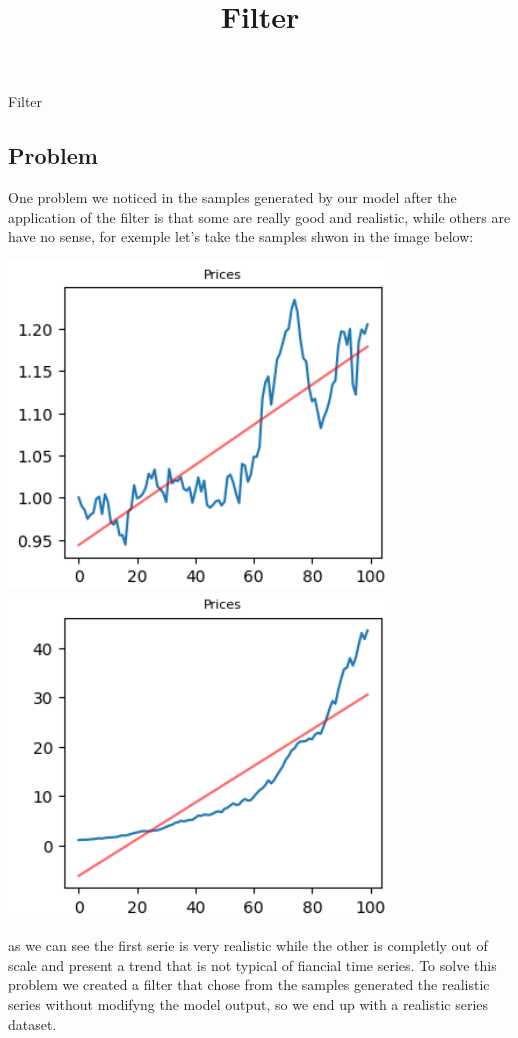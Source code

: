 \documentclass{article}
\title{Filter}
\begin{document}
\begin{center}
    {\huge{Filter}}
\end{center}    
    \begin{multicols}{2}
    \section*{Problem}
    One problem we noticed in the samples generated by our model after the application of the filter is that some are really good and realistic, while others are 
    have no sense, for exemple let's take the samples shwon in the image below:
    \begin{center}
        \includegraphics[scale=0.49]{imgs/serie_comp_1.png}
        \includegraphics[scale=0.49]{imgs/serie_comp_2.png}
    \end{center}
    as we can see the first serie is very realistic while the other is completly out of scale and present a trend that is not 
    typical of fiancial time series. To solve this problem we created a filter that chose from the samples generated the realistic series without modifyng the model output, so we end up with a realistic series dataset.

\end{multicols}
\end{document}
